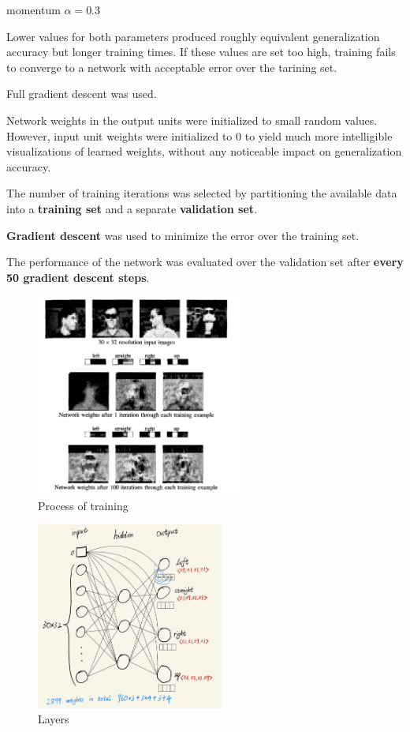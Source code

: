 momentum $\alpha = 0.3$

Lower values for both parameters produced roughly equivalent generalization accuracy but longer training times. If these values are set too high, training fails to converge to a network with acceptable error over the tarining set.

Full gradient descent was used.

Network weights in the output units were initialized to small random values. However, input unit weights were initialized to 0 to yield much more intelligible visualizations of learned weights, without any noticeable impact on generalization accuracy.

The number of training iterations was selected by partitioning the available data into a \textbf{training set} and a separate \textbf{validation set}.

\textbf{Gradient descent} was used to minimize the error over the training set.

The performance of the network was evaluated over the validation set after \textbf{every 50 gradient descent steps}.

\begin{figure}[H]
    \centering
    \includegraphics[width=0.6\textwidth]{./2023April/faceRecog.png}
    \caption{Process of training}
    \label{faceRecognition}
\end{figure}

\begin{figure}[H]
    \centering
    \includegraphics[width=0.55\textwidth]{./2023April/faceRecogLayer.png}
    \caption{Layers}
    \label{faceRecognitionLayers}
\end{figure}

